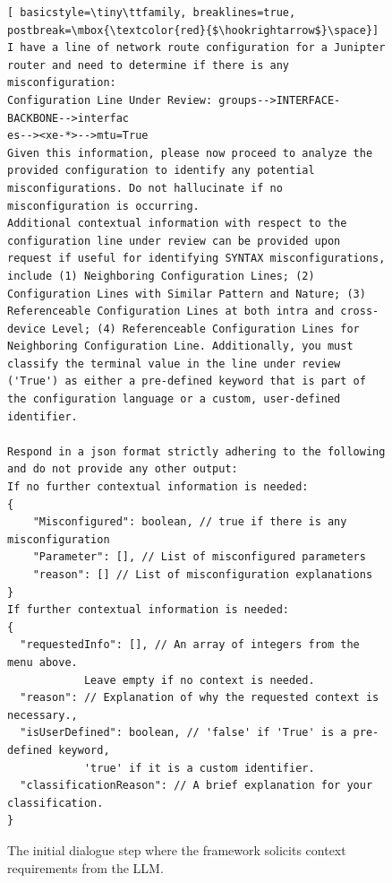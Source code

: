 \begin{figure}[t]
    \centering
    \begin{mdframed}
    \begin{lstlisting}[ basicstyle=\tiny\ttfamily, breaklines=true,     postbreak=\mbox{\textcolor{red}{$\hookrightarrow$}\space}]
I have a line of network route configuration for a Junipter router and need to determine if there is any misconfiguration:
Configuration Line Under Review: groups-->INTERFACE-BACKBONE-->interfac
es--><xe-*>-->mtu=True
Given this information, please now proceed to analyze the provided configuration to identify any potential misconfigurations. Do not hallucinate if no misconfiguration is occurring.
Additional contextual information with respect to the configuration line under review can be provided upon request if useful for identifying SYNTAX misconfigurations, include (1) Neighboring Configuration Lines; (2) Configuration Lines with Similar Pattern and Nature; (3) Referenceable Configuration Lines at both intra and cross-device Level; (4) Referenceable Configuration Lines for Neighboring Configuration Line. Additionally, you must classify the terminal value in the line under review ('True') as either a pre-defined keyword that is part of the configuration language or a custom, user-defined identifier.

Respond in a json format strictly adhering to the following and do not provide any other output:
If no further contextual information is needed:
{
    "Misconfigured": boolean, // true if there is any misconfiguration
    "Parameter": [], // List of misconfigured parameters
    "reason": [] // List of misconfiguration explanations
}
If further contextual information is needed:
{
  "requestedInfo": [], // An array of integers from the menu above.
			Leave empty if no context is needed.
  "reason": // Explanation of why the requested context is necessary.,
  "isUserDefined": boolean, // 'false' if 'True' is a pre-defined keyword,
			'true' if it is a custom identifier.
  "classificationReason": // A brief explanation for your classification.
}
    \end{lstlisting}
    \end{mdframed}
    \caption{The initial dialogue step where the framework solicits context requirements from the LLM.}
    \label{fig:step1_initial_prompt}
\end{figure}






